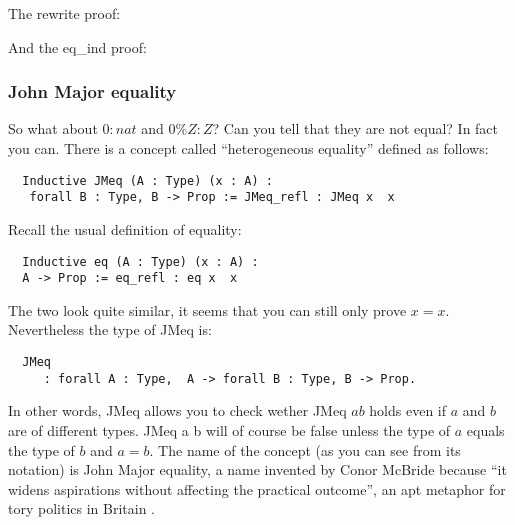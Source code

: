 The rewrite proof:
     
     And the eq\_ind proof:


  \subsubsection{John Major equality}
  
  So what about $0:nat$ and $0\%Z: Z$? Can you tell that they are  not equal?  In fact you can. There is a concept called ``heterogeneous	equality'' defined as follows:
  
  \begin{verbatim}
  Inductive JMeq (A : Type) (x : A) :
   forall B : Type, B -> Prop := JMeq_refl : JMeq x  x
  \end{verbatim}
  
  Recall the usual definition of equality:
  \begin{verbatim}
  Inductive eq (A : Type) (x : A) :
  A -> Prop := eq_refl : eq x  x
  \end{verbatim}
  
  The two look quite similar, it seems that you can still only prove $x=x$. Nevertheless the type of JMeq is:
  
  \begin{verbatim}
  JMeq
     : forall A : Type,  A -> forall B : Type, B -> Prop.
  \end{verbatim}
  In other words, JMeq allows you to check wether JMeq $a b$ holds even if $a$ and $b$ are of different types. JMeq a b will of course be  false unless the type of $a$ equals the type of $b$ and $a=b$. The name of the concept (as you can see from its notation) is John Major equality, a name invented by Conor McBride  because ``it widens aspirations without affecting	the practical outcome'', an apt metaphor for tory politics  in Britain . 
  
